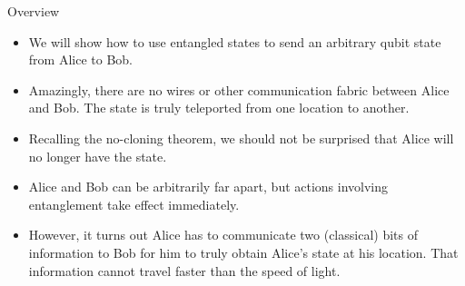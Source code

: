 
\begin{frame}{Overview}
    \begin{itemize}[<+->]
        \item We will show how to use entangled states to send an arbitrary qubit state from Alice to Bob.
        \item Amazingly, there are no wires or other communication fabric between Alice and Bob.  The state is truly teleported from one location to another.
        \item Recalling the no-cloning theorem, we should not be surprised that Alice will no longer have the state.
        \item Alice and Bob can be arbitrarily far apart, but actions involving entanglement take effect immediately.
        \item However, it turns out Alice has to communicate two (classical) bits of information to Bob for him to truly obtain Alice's state at his location.  That information cannot travel faster than the speed of light.
    \end{itemize}
\end{frame}

